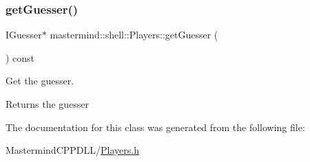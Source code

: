 \subsubsection{\texorpdfstring{get\+Guesser()}{getGuesser()}}
{\footnotesize\ttfamily I\+Guesser$\ast$ mastermind\+::shell\+::\+Players\+::get\+Guesser (\begin{DoxyParamCaption}{ }\end{DoxyParamCaption}) const\hspace{0.3cm}{\ttfamily [inline]}}



Get the guesser. 

\begin{DoxyReturn}{Returns}
the guesser 
\end{DoxyReturn}


The documentation for this class was generated from the following file\+:\begin{DoxyCompactItemize}
\item 
Mastermind\+C\+P\+P\+D\+L\+L/\hyperlink{_players_8h}{Players.\+h}\end{DoxyCompactItemize}
